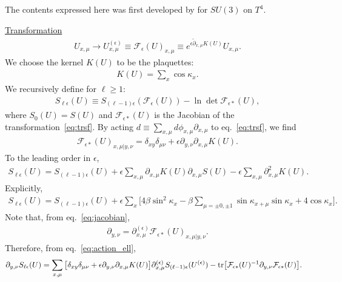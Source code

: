 \documentclass[12pt]{article}
\begin{document}
The contents expressed here was
first developed by \cite{Luscher:2009eq} for $SU(3)$ on $T^4$.

\noindent \underline{Transformation}
\begin{align}
  U_{x,\mu} \to U_{x,\mu}^{(\epsilon)} \equiv \mathcal{F}_\epsilon(U)_{x,\mu}
  \equiv
  e^{\epsilon \tilde\partial_{x,\mu} K(U)} U_{x,\mu}.
  \label{eq:trsf}
\end{align}
We choose the kernel $K(U)$ to be the plaquettes:
\begin{align}
  K(U) = \sum_{x} \cos\kappa_{x}.
  \label{eq:tilde_s}
\end{align}
We recursively define for $\ell \geq 1$:
\begin{align}
  S_{\ell\epsilon}(U) \equiv
  S_{(\ell-1)\epsilon} (\mathcal{F}_\epsilon(U))
  - \ln \det \mathcal{F}_{\epsilon*}(U),
  \label{eq:action_ell}
\end{align}
where $S_0(U)=S(U)$
and $\mathcal{F}_{\epsilon *}(U)$ is
the Jacobian of the transformation~\eqref{eq:trsf}.
By acting
$d\equiv \sum_{x,\mu}d\phi_{x,\mu} \partial_{x,\mu}$
to eq.~\eqref{eq:trsf}, we find
\begin{align}
  \mathcal{F}_{\epsilon *}(U)_{x,\mu|y,\nu}
  =\delta_{xy}\delta_{\mu\nu}
  + \epsilon \partial_{y,\nu} \partial_{x,\mu} K(U).
  \label{eq:jacobian}
\end{align}
To the leading order in $\epsilon$,
\begin{align}
  S_{\ell\epsilon}(U) =
  S_{(\ell-1)\epsilon}(U)
  +
  \epsilon \sum_{x,\mu}
  \partial_{x,\mu}K(U) \partial_{x,\mu}S(U)
  -
  \epsilon \sum_{x,\mu}
  \partial_{x,\mu}^2 K(U).
\end{align}
Explicitly,
\begin{align}
  S_{\ell\epsilon}(U)
  =
  S_{(\ell-1)\epsilon}(U) + \epsilon \sum_{x} \Big[
  4 \beta \sin^2\kappa_x
  - \beta \sum_{\mu=\pm 0,\pm1} \sin\kappa_{x+\mu} \sin \kappa_x
  + 4 \cos\kappa_x
  \Big].
\end{align}
Note that, from eq.~\eqref{eq:jacobian},
\begin{align}
  \partial_{y,\nu}
  =\partial_{x,\mu}^{(\epsilon)}
  \mathcal{F}_{\epsilon *}(U)_{x,\mu|y,\nu}.
  \label{eq:deriv_law}
\end{align}
Therefore, from eq.~\eqref{eq:action_ell},
\begin{align}
  \partial_{y,\nu} S_{\ell \epsilon}(U)
  &=
    \sum_{x,\mu}
    \big[\delta_{xy}\delta_{\mu\nu}
    + \epsilon \partial_{y,\nu} \partial_{x,\mu}
    K(U)
    \big]
    \partial_{x,\mu}^{(\epsilon)}
    S_{(\ell-1) \epsilon}(U^{(\epsilon)}) 
    - {\rm tr} \big[\mathcal{F}_{\epsilon *}(U)^{-1}
    \partial_{y,\nu} \mathcal{F}_{\epsilon *}(U) \big].
    \label{eq:force_prop2}
\end{align}
\end{document}
